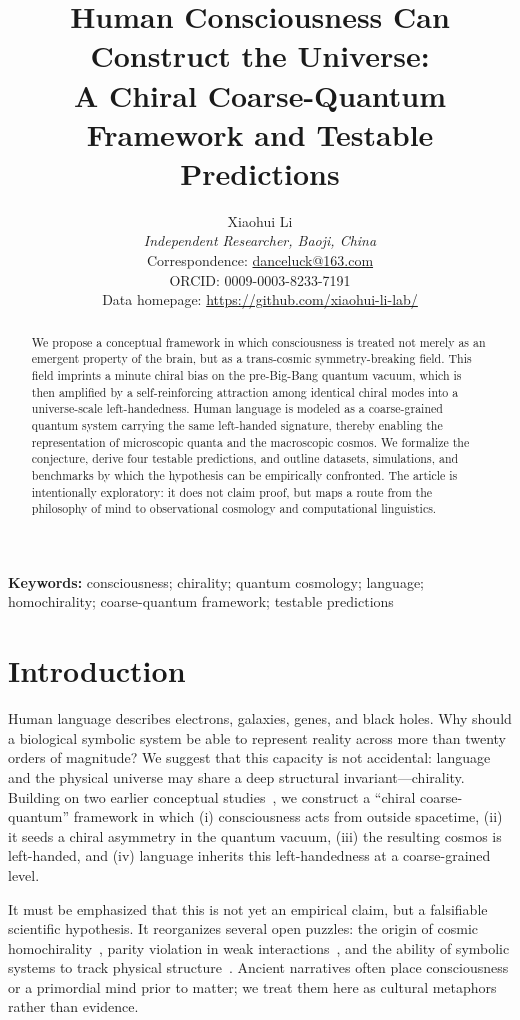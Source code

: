 \documentclass[10pt,a4paper]{article}
\title{\textbf{Human Consciousness Can Construct the Universe:\\
A Chiral Coarse-Quantum Framework and Testable Predictions}}
\author{
Xiaohui Li\\
\textit{Independent Researcher, Baoji, China}\\
Correspondence: \href{mailto:danceluck@163.com}{danceluck@163.com}\\
ORCID: 0009-0003-8233-7191\\
Data homepage: \url{https://github.com/xiaohui-li-lab/}
}
\date{}
\begin{document}
\maketitle

\begin{abstract}
We propose a conceptual framework in which consciousness is treated not merely as an emergent property of the brain, but as a trans-cosmic symmetry-breaking field. This field imprints a minute chiral bias on the pre-Big-Bang quantum vacuum, which is then amplified by a self-reinforcing attraction among identical chiral modes into a universe-scale left-handedness. Human language is modeled as a coarse-grained quantum system carrying the same left-handed signature, thereby enabling the representation of microscopic quanta and the macroscopic cosmos. We formalize the conjecture, derive four testable predictions, and outline datasets, simulations, and benchmarks by which the hypothesis can be empirically confronted. The article is intentionally exploratory: it does not claim proof, but maps a route from the philosophy of mind to observational cosmology and computational linguistics.
\end{abstract}

\noindent\textbf{Keywords:} consciousness; chirality; quantum cosmology; language; homochirality; coarse-quantum framework; testable predictions

\section*{Introduction}
Human language describes electrons, galaxies, genes, and black holes. Why should a biological symbolic system be able to represent reality across more than twenty orders of magnitude? We suggest that this capacity is not accidental: language and the physical universe may share a deep structural invariant---chirality. Building on two earlier conceptual studies~\cite{Li2026a,Li2026b}, we construct a ``chiral coarse-quantum'' framework in which (i) consciousness acts from outside spacetime, (ii) it seeds a chiral asymmetry in the quantum vacuum, (iii) the resulting cosmos is left-handed, and (iv) language inherits this left-handedness at a coarse-grained level.

It must be emphasized that this is not yet an empirical claim, but a falsifiable scientific hypothesis. It reorganizes several open puzzles: the origin of cosmic homochirality~\cite{Bada1995}, parity violation in weak interactions~\cite{LeeYang1956,Wu1957}, and the ability of symbolic systems to track physical structure~\cite{UD}. Ancient narratives often place consciousness or a primordial mind prior to matter; we treat them here as cultural metaphors rather than evidence.
\end{document}
